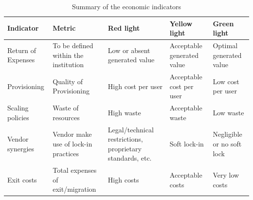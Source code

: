 \begin{table}[ht!]
    \centering
    \small
    \renewcommand{\arraystretch}{1.5} %
    \begin{tabular}{|>{\centering\arraybackslash}m{3cm}|>{\centering\arraybackslash}m{3.1cm}|>{\centering\arraybackslash}m{2.9cm}|>{\centering\arraybackslash}m{2.9cm}|>{\centering\arraybackslash}m{2.9cm}|}
        \hline
        \textbf{Indicator} & \textbf{Metric} & \textbf{Red light} & \textbf{Yellow light} & \textbf{Green light} \\
        \hline
        Return of Expenses & To be defined within the institution & Low or absent generated value & Acceptable generated value & Optimal generated value \\
        \hline
        Provisioning & Quality of Provisioning & High cost per user & Acceptable cost per user & Low cost per user \\
        \hline
        Scaling policies & Waste of resources & High waste & Acceptable waste & Low waste \\
        \hline
        Vendor synergies & Vendor make use of lock-in practices & Legal/technical restrictions, proprietary standards, etc. & Soft lock-in & Negligible or no soft lock \\
        \hline
        Exit costs & Total expenses of exit/migration & High costs & Acceptable costs & Very low costs \\
        \hline
    \end{tabular}
    \caption{Summary of the economic indicators}
    \label{tab:summary_economic_indicators}
\end{table}

